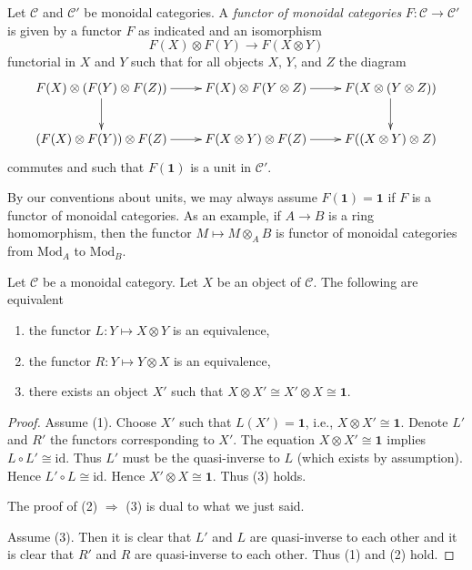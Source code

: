\begin{definition}
\label{definition-functor-monoidal-categories}
Let $\mathcal{C}$ and $\mathcal{C}'$ be monoidal categories.
A {\it functor of monoidal categories} $F : \mathcal{C} \to \mathcal{C}'$
is given by a functor $F$ as indicated and an isomorphism
$$
F(X) \otimes F(Y) \to F(X \otimes Y)
$$
functorial in $X$ and $Y$
such that for all objects $X$, $Y$, and $Z$ the diagram
$$
\xymatrix{
F(X) \otimes (F(Y) \otimes F(Z)) \ar[r] \ar[d] &
F(X) \otimes F(Y \otimes Z) \ar[r] &
F(X \otimes (Y \otimes Z)) \ar[d] \\
(F(X) \otimes F(Y)) \otimes F(Z) \ar[r] &
F(X \otimes Y) \otimes F(Z) \ar[r] &
F((X \otimes Y) \otimes Z)
}
$$
commutes and such that $F(\mathbf{1})$ is a unit in $\mathcal{C}'$.
\end{definition}

\noindent
By our conventions about units, we may always assume
$F(\mathbf{1}) = \mathbf{1}$ if $F$ is a functor of monoidal categories.
As an example, if $A \to B$ is a ring homomorphism, then
the functor $M \mapsto M \otimes_A B$ is functor of monoidal
categories from $\text{Mod}_A$ to $\text{Mod}_B$.

\begin{lemma}
\label{lemma-invertible}
Let $\mathcal{C}$ be a monoidal category. Let $X$ be an object of
$\mathcal{C}$. The following are equivalent
\begin{enumerate}
\item the functor $L : Y \mapsto X \otimes Y$ is an equivalence,
\item the functor $R : Y \mapsto Y \otimes X$ is an equivalence,
\item there exists an object $X'$ such that
$X \otimes X' \cong X' \otimes X \cong \mathbf{1}$.
\end{enumerate}
\end{lemma}

\begin{proof}
Assume (1). Choose $X'$ such that $L(X') = \mathbf{1}$, i.e.,
$X \otimes X' \cong \mathbf{1}$. Denote $L'$ and $R'$ the functors
corresponding to $X'$. The equation $X \otimes X' \cong \mathbf{1}$
implies $L \circ L' \cong \text{id}$. Thus $L'$ must be the quasi-inverse
to $L$ (which exists by assumption). Hence $L' \circ L \cong \text{id}$.
Hence $X' \otimes X \cong \mathbf{1}$. Thus (3) holds.

\medskip\noindent
The proof of (2) $\Rightarrow$ (3) is dual to what we just said.

\medskip\noindent
Assume (3). Then it is clear that $L'$ and $L$ are quasi-inverse
to each other and it is clear that $R'$ and $R$ are quasi-inverse
to each other. Thus (1) and (2) hold.
\end{proof}

